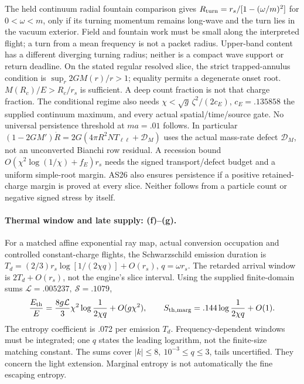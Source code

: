 \documentclass[10pt]{article}
\begin{document}
The held continuum radial fountain comparison gives
\(R_{\rm turn}=r_s/[1-(\omega/m)^2]\) for \(0<\omega<m\),
only if its turning momentum remains long-wave and
the turn lies in the vacuum exterior. Field and
fountain work must be small along the interpreted
flight; a turn from a mean frequency is not a packet radius.
Upper-band
content has a different diverging turning radius;
neither is a compact wave support or return deadline.
On the stated regular resolved slice, the strict
trapped-annulus condition is \(\sup_r2GM(r)/r>1\);
equality permits a degenerate onset root.
\(M(R_c)/E>R_c/r_s\) is sufficient. A deep count
fraction is not that charge fraction. The conditional
regime also needs
\(\chi<\sqrt g\,\zeta^2/(2c_E)\), \(c_E=.135858\)
the supplied continuum maximum, and every actual
spatial/time/source gate. No universal persistence
threshold at \(ma=.01\) follows.
In particular
\((1-2GM')\dot R=2G(4\pi R^2NT_{\ell\ell}+\mathcal D_M)\)
uses the actual mass-rate defect \(\mathcal D_M\), not
an unconverted Bianchi row residual. A recession bound
\(O(\chi^2\log(1/\chi)+f_E)r_s\) needs the signed
transport/defect budget and a uniform simple-root margin.
AS26 also ensures persistence if a positive retained-charge
margin is proved at every slice. Neither follows from a
particle count or negative signed stress by itself.

\paragraph{Thermal window and late supply: (f)--(g).}
For a matched affine exponential ray map, actual
conversion occupation and controlled constant-charge
flights, the Schwarzschild emission duration is
\(T_d=(2/3)r_s\log[1/(2\chi q)]+O(r_s)\),
\(q=\omega r_s\). The retarded arrival window is
\(2T_d+O(r_s)\), not the engine's slice interval.
Using the supplied finite-domain sums
\(\mathcal L=.005237,\ \mathcal S=.1079\),
\[
 \frac{E_{\rm th}}E=
 \frac{8g\mathcal L}{3}\chi^2\log\frac1{2\chi q}
       +O(g\chi^2),\qquad
 S_{\rm th,marg}=.144\log\frac1{2\chi q}+O(1).
\]
The entropy coefficient is .072 per emission \(T_d\).
Frequency-dependent windows must be integrated;
one \(q\) states the leading logarithm, not the
finite-size matching constant. The sums cover
\(|k|\le8,\ 10^{-3}\le q\le3\), tails uncertified.
They concern the light extension. Marginal entropy
is not automatically the fine escaping entropy.
\end{document}
